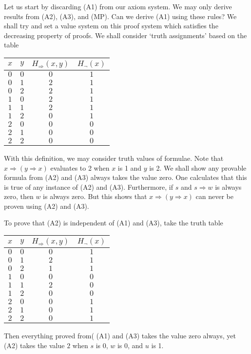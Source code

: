 Let us start by discarding (A1) from our axiom system. We may only derive results from (A2), (A3), and (MP). Can we derive (A1) using these rules? We shall try and set a value system on this proof system which satisfies the decreasing property of proofs. We shall consider `truth assignments' based on the table
%
\begin{center}
    \begin{tabular}{| c | c | c | c | }
        \hline $x$ & $y$ & $H_\Rightarrow(x,y)$ & $H_\neg(x)$ \\
        \hline $0$ & $0$ & $0$ & $1$ \\
        $0$ & $1$ & $2$ & $1$ \\
        $0$ & $2$ & $2$ & $1$ \\
        $1$ & $0$ & $2$ & $1$ \\
        $1$ & $1$ & $2$ & $1$ \\
        $1$ & $2$ & $0$ & $1$ \\
        $2$ & $0$ & $0$ & $0$ \\
        $2$ & $1$ & $0$ & $0$ \\
        $2$ & $2$ & $0$ & $0$ \\
        \hline
    \end{tabular}
\end{center}
%
With this definition, we may consider truth values of formulae. Note that $x \Rightarrow (y \Rightarrow x)$ evaluates to 2 when $x$ is 1 and $y$ is 2. We shall show any provable formula from (A2) and (A3) always takes the value zero. One calculates that this is true of any instance of (A2) and (A3). Furthermore, if $s$ and $s \Rightarrow w$ is always zero, then $w$ is always zero. But this shows that $x \Rightarrow (y \Rightarrow x)$ can never be proven using (A2) and (A3).

To prove that (A2) is independent of (A1) and (A3), take the truth table
%
\begin{center}
    \begin{tabular}{| c | c | c | c | }
        \hline $x$ & $y$ & $H_\Rightarrow(x,y)$ & $H_\neg(x)$ \\
        \hline $0$ & $0$ & $0$ & $1$ \\
        $0$ & $1$ & $2$ & $1$ \\
        $0$ & $2$ & $1$ & $1$ \\
        $1$ & $0$ & $0$ & $0$ \\
        $1$ & $1$ & $2$ & $0$ \\
        $1$ & $2$ & $0$ & $0$ \\
        $2$ & $0$ & $0$ & $1$ \\
        $2$ & $1$ & $0$ & $1$ \\
        $2$ & $2$ & $0$ & $1$ \\
        \hline
    \end{tabular}
\end{center}
%
Then everything proved from( (A1) and (A3) takes the value zero always, yet (A2) takes the value $2$ when $s$ is 0, $w$ is 0, and $u$ is 1.

